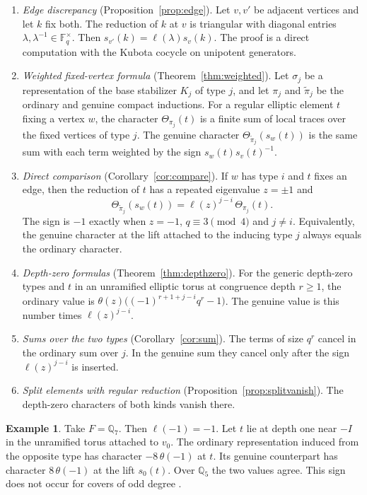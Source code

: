 \documentclass[12pt,letterpaper]{article}
\numberwithin{equation}{section}
\theoremstyle{definition}
\newtheorem{example}[theorem]{Example}
\theoremstyle{remark}
\newcommand{\kk}{\mathbb F_q}
\begin{document}
\begin{enumerate}[leftmargin=2em]
\item \emph{Edge discrepancy} (Proposition~\ref{prop:edge}). Let $v,v'$ be adjacent vertices and let $k$ fix both. The reduction of $k$ at $v$ is triangular with diagonal entries $\lambda,\lambda^{-1}\in\kk^\times$. Then $s_{v'}(k)=\ell(\lambda)s_v(k)$. The proof is a direct computation with the Kubota cocycle on unipotent generators.
\item \emph{Weighted fixed-vertex formula} (Theorem~\ref{thm:weighted}). Let $\sigma_j$ be a representation of the base stabilizer $K_j$ of type $j$, and let $\pi_j$ and $\widetilde\pi_j$ be the ordinary and genuine compact inductions. For a regular elliptic element $t$ fixing a vertex $w$, the character $\Theta_{\pi_j}(t)$ is a finite sum of local traces over the fixed vertices of type $j$. The genuine character $\Theta_{\widetilde\pi_j}(s_w(t))$ is the same sum with each term weighted by the sign $s_w(t)s_v(t)^{-1}$.
\item \emph{Direct comparison} (Corollary~\ref{cor:compare}). If $w$ has type $i$ and $t$ fixes an edge, then the reduction of $t$ has a repeated eigenvalue $z=\pm1$ and
\[
 \Theta_{\widetilde\pi_j}(s_w(t))=\ell(z)^{j-i}\,\Theta_{\pi_j}(t).
\]
The sign is $-1$ exactly when $z=-1$, $q\equiv3\pmod4$ and $j\ne i$. Equivalently, the genuine character at the lift attached to the inducing type $j$ always equals the ordinary character.
\item \emph{Depth-zero formulas} (Theorem~\ref{thm:depthzero}). For the generic depth-zero types and $t$ in an unramified elliptic torus at congruence depth $r\ge1$, the ordinary value is $\theta(z)\bigl((-1)^{r+1+j-i}q^r-1\bigr)$. The genuine value is this number times $\ell(z)^{j-i}$.
\item \emph{Sums over the two types} (Corollary~\ref{cor:sum}). The terms of size $q^r$ cancel in the ordinary sum over $j$. In the genuine sum they cancel only after the sign $\ell(z)^{j-i}$ is inserted.
\item \emph{Split elements with regular reduction} (Proposition~\ref{prop:splitvanish}). The depth-zero characters of both kinds vanish there.
\end{enumerate}

\begin{example}\label{ex:intro}
Take $F=\mathbb Q_7$. Then $\ell(-1)=-1$. Let $t$ lie at depth one near $-I$ in the unramified torus attached to $v_0$. The ordinary representation induced from the opposite type has character $-8\,\theta(-1)$ at $t$. Its genuine counterpart has character $8\,\theta(-1)$ at the lift $s_0(t)$. Over $\mathbb Q_5$ the two values agree. This sign does not occur for covers of odd degree \cite{Jo26}.
\end{example}
\end{document}
